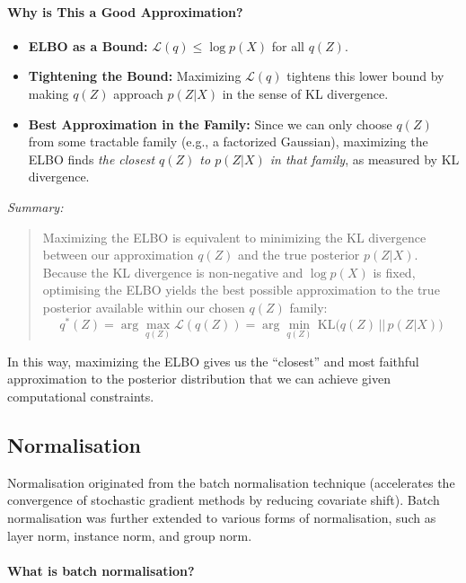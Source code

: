 \paragraph{Why is This a Good Approximation?}
\begin{itemize}
    \item \textbf{ELBO as a Bound:} $\mathcal{L}(q) \leq \log p(X)$ for all $q(Z)$.
    \item \textbf{Tightening the Bound:} Maximizing $\mathcal{L}(q)$ tightens this lower bound by making $q(Z)$ approach $p(Z|X)$ in the sense of KL divergence.
    \item \textbf{Best Approximation in the Family:} Since we can only choose $q(Z)$ from some tractable family (e.g., a factorized Gaussian), maximizing the ELBO finds \emph{the closest $q(Z)$ to $p(Z|X)$ in that family}, as measured by KL divergence.
\end{itemize}

\bigskip

\noindent
\textit{Summary:}
\begin{quote}
Maximizing the ELBO is equivalent to minimizing the KL divergence between our approximation $q(Z)$ and the true posterior $p(Z|X)$. Because the KL divergence is non-negative and $\log p(X)$ is fixed, optimising the ELBO yields the best possible approximation to the true posterior available within our chosen $q(Z)$ family:
\[
\boxed{
q^{*}(Z) = \arg\max_{q(Z)} \mathcal{L}(q(Z)) = \arg\min_{q(Z)}\, \mathrm{KL}\big(q(Z)\,||\,p(Z|X)\big)
}
\]
\end{quote}

In this way, maximizing the ELBO gives us the ``closest'' and most faithful approximation to the posterior distribution that we can achieve given computational constraints.


\newpage
\subsection{Normalisation}

Normalisation originated from the batch normalisation technique
(accelerates the convergence of stochastic gradient methods by reducing covariate shift).
Batch normalisation was further extended to various forms of normalisation,
such as layer norm, instance norm, and group norm.

\paragraph{What is batch normalisation?}

